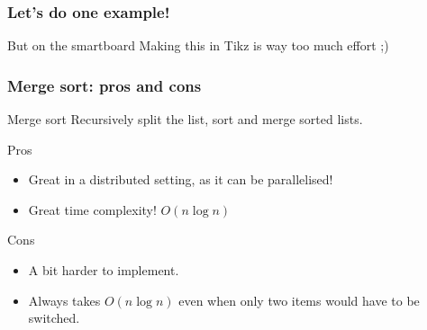 \begin{frame}
	\frametitle{Let's do one example!}
	\begin{block}{But on the smartboard}
		Making this in Tikz is way too much effort ;)
	\end{block}		
\end{frame}

\begin{frame}
	\frametitle{Merge sort: pros and cons}
	\begin{block}{Merge sort}
			Recursively split the list, sort and merge sorted lists.
		\end{block}	
		\begin{exampleblock}{Pros}
			\begin{itemize}
				\item Great in a distributed setting, as it can be parallelised!
				\item Great time complexity! $O(n\log n)$
			\end{itemize}
		\end{exampleblock}	
		\begin{alertblock}{Cons}
			\begin{itemize}
				\item A bit harder to implement.
				\item Always takes $O(n \log n)$ even when only two items would have to be switched.
			\end{itemize}
		\end{alertblock}	
\end{frame}
